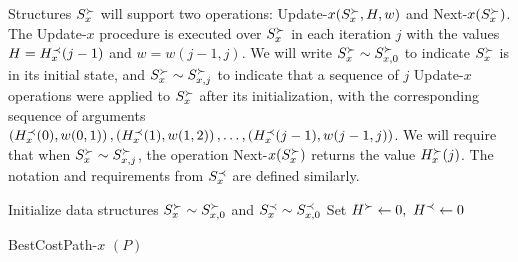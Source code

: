 Structures $S^\succ_x$ will support two operations: Update-$x(S^\succ_x, H, w)$ and Next-$x(S^\succ_x)$. The Update-$x$ procedure is executed over $S^\succ_x$ in each iteration $j$ with the values $H = H^\prec_x(j-1)$ and $w = w(j-1, j)$. We will write $S^\succ_x \sim S^\succ_{x, 0}$ to indicate $S^\succ_x$ is in its initial state, and $S^\succ_x \sim S^\succ_{x, j}$ to indicate that a sequence of $j$ Update-$x$ operations were applied to $S^\succ_x$ after its initialization, with the corresponding sequence of arguments $\left(H^\prec_x(0), w(0, 1)\right), \left(H^\prec_x(1), w(1, 2)\right), \ldots, \left(H^\prec_x(j-1), w(j-1, j)\right)$. We will require that when $S^\succ_x \sim S^\succ_{x, j}$, the operation Next-$x(S^\succ_x)$ returns the value $H^\succ_x(j)$. The notation and requirements from $S^\prec_x$ are defined similarly.


\begin{algorithm}
	Initialize data structures $S^\succ_x \sim S^\succ_{x, 0}$ and $S^\prec_x \sim S^\prec_{x, 0}$\; 
	Set $H^\succ \gets 0, \ H^\prec \gets 0$\;
	\;
	\caption{BestCostPath-$x$ $(P)$}
	\label{algo:H}
\end{algorithm}

